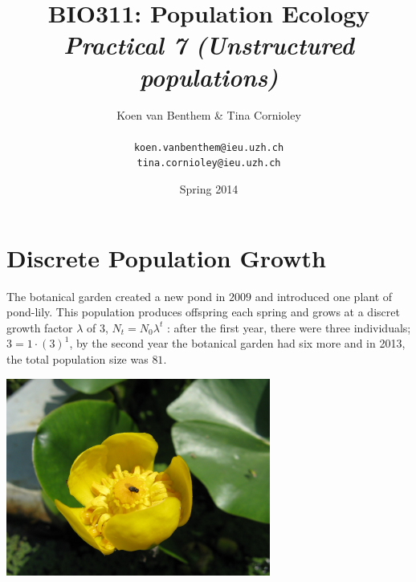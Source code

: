 \documentclass{article}\usepackage[]{graphicx}\usepackage[]{color}
\title{BIO311: Population Ecology\\ \textit{Practical 7 (Unstructured populations)}}
\author{Koen van Benthem \& Tina Cornioley\\\\
\tt{koen.vanbenthem@ieu.uzh.ch}\\ \tt{tina.cornioley@ieu.uzh.ch}}
\date{Spring 2014}
\begin{document}
\maketitle
\tableofcontents
\vspace{3cm}

\newpage


\section{Discrete Population Growth}
The botanical garden created a new pond in $2009$ and introduced one plant of pond-lily. This population produces offspring each spring and grows at a discret growth factor $\lambda$ of $3$, $N_t=N_0\lambda ^t$ : after the first year, there were three individuals; $3=1 \cdot (3)^1$, by the second year the botanical garden had six more and in 2013, the total population size was $81$.

\vspace{1.5ex}

\begin{center}
\includegraphics[width=0.65\textwidth]{Nuphar_pumilum2.jpg}
\end{center}
\vspace{1.5ex}
\end{document}

